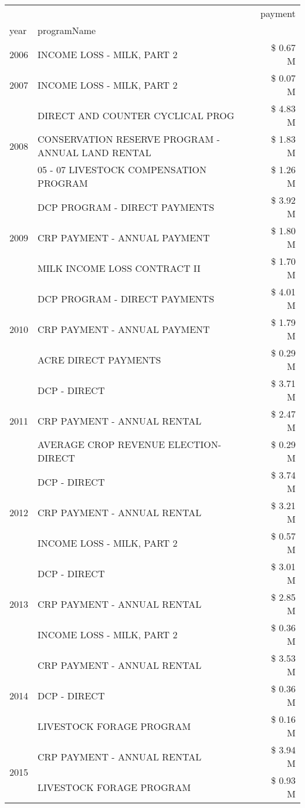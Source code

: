 \begin{tabular}{llr}
\toprule
 &  & payment \\
year & programName &  \\
\midrule
2006 & INCOME LOSS - MILK, PART 2 & \$ 0.67 M \\
\cline{1-3}
2007 & INCOME LOSS - MILK, PART 2 & \$ 0.07 M \\
\cline{1-3}
\multirow[t]{3}{*}{2008} & DIRECT AND COUNTER CYCLICAL PROG & \$ 4.83 M \\
 & CONSERVATION RESERVE PROGRAM - ANNUAL LAND RENTAL & \$ 1.83 M \\
 & 05 - 07 LIVESTOCK COMPENSATION PROGRAM & \$ 1.26 M \\
\cline{1-3}
\multirow[t]{3}{*}{2009} & DCP PROGRAM - DIRECT PAYMENTS & \$ 3.92 M \\
 & CRP PAYMENT - ANNUAL PAYMENT & \$ 1.80 M \\
 & MILK INCOME LOSS CONTRACT II & \$ 1.70 M \\
\cline{1-3}
\multirow[t]{3}{*}{2010} & DCP PROGRAM - DIRECT PAYMENTS & \$ 4.01 M \\
 & CRP PAYMENT - ANNUAL PAYMENT & \$ 1.79 M \\
 & ACRE DIRECT PAYMENTS & \$ 0.29 M \\
\cline{1-3}
\multirow[t]{3}{*}{2011} & DCP - DIRECT & \$ 3.71 M \\
 & CRP PAYMENT - ANNUAL RENTAL & \$ 2.47 M \\
 & AVERAGE CROP REVENUE ELECTION-DIRECT & \$ 0.29 M \\
\cline{1-3}
\multirow[t]{3}{*}{2012} & DCP - DIRECT & \$ 3.74 M \\
 & CRP PAYMENT - ANNUAL RENTAL & \$ 3.21 M \\
 & INCOME LOSS - MILK, PART 2 & \$ 0.57 M \\
\cline{1-3}
\multirow[t]{3}{*}{2013} & DCP - DIRECT & \$ 3.01 M \\
 & CRP PAYMENT - ANNUAL RENTAL & \$ 2.85 M \\
 & INCOME LOSS - MILK, PART 2 & \$ 0.36 M \\
\cline{1-3}
\multirow[t]{3}{*}{2014} & CRP PAYMENT - ANNUAL RENTAL & \$ 3.53 M \\
 & DCP - DIRECT & \$ 0.36 M \\
 & LIVESTOCK FORAGE PROGRAM & \$ 0.16 M \\
\cline{1-3}
\multirow[t]{3}{*}{2015} & CRP PAYMENT - ANNUAL RENTAL & \$ 3.94 M \\
 & LIVESTOCK FORAGE PROGRAM & \$ 0.93 M \\

\end{tabular}
